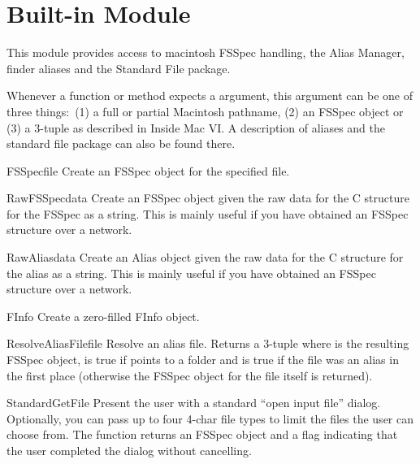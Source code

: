 \section{Built-in Module }
\label{module-macfs}

\renewcommand{\indexsubitem}{(in module macfs)}

This module provides access to macintosh FSSpec handling, the Alias
Manager, finder aliases and the Standard File package.

Whenever a function or method expects a  argument, this
argument can be one of three things:\ (1) a full or partial Macintosh
pathname, (2) an FSSpec object or (3) a 3-tuple  as described in Inside Mac VI\@. A description of aliases
and the standard file package can also be found there.

\begin{funcdesc}{FSSpec}{file}
Create an FSSpec object for the specified file.
\end{funcdesc}

\begin{funcdesc}{RawFSSpec}{data}
Create an FSSpec object given the raw data for the C structure for the
FSSpec as a string.  This is mainly useful if you have obtained an
FSSpec structure over a network.
\end{funcdesc}

\begin{funcdesc}{RawAlias}{data}
Create an Alias object given the raw data for the C structure for the
alias as a string.  This is mainly useful if you have obtained an
FSSpec structure over a network.
\end{funcdesc}

\begin{funcdesc}{FInfo}{}
Create a zero-filled FInfo object.
\end{funcdesc}

\begin{funcdesc}{ResolveAliasFile}{file}
Resolve an alias file. Returns a 3-tuple  where  is the resulting FSSpec object,
 is true if  points to a folder and
 is true if the file was an alias in the first place
(otherwise the FSSpec object for the file itself is returned).
\end{funcdesc}

\begin{funcdesc}{StandardGetFile}{}
Present the user with a standard ``open input file''
dialog. Optionally, you can pass up to four 4-char file types to limit
the files the user can choose from. The function returns an FSSpec
object and a flag indicating that the user completed the dialog
without cancelling.
\end{funcdesc}


